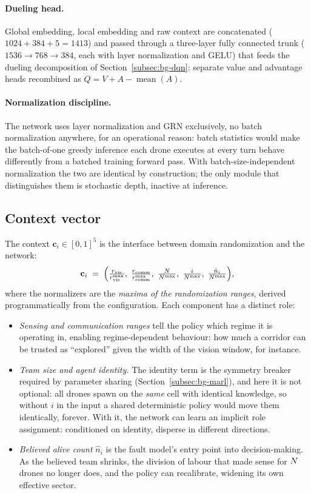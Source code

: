 \paragraph{Dueling head.}
Global embedding, local embedding and raw context are concatenated
($1024 + 384 + 5 = 1413$) and passed through a three-layer fully connected trunk
($1536 \to 768 \to 384$, each with layer normalization and GELU) that feeds the
dueling decomposition of Section~\ref{subsec:bg-dqn}: separate value and
advantage heads recombined as $Q = V + A - \operatorname{mean}(A)$.

\paragraph{Normalization discipline.}
The network uses layer normalization \citep{ba2016layer} and GRN exclusively, no
batch normalization anywhere, for an operational reason: batch statistics would
make the batch-of-one greedy inference each drone executes at every turn behave
differently from a batched training forward pass. With batch-size-independent
normalization the two are identical by construction; the only module that
distinguishes them is stochastic depth, inactive at inference.

\subsection{Context vector}
\label{subsec:arch-context}

The context $\mathbf{c}_i \in [0,1]^5$ is the interface between domain
randomization and the network:
\[
\mathbf{c}_i \;=\;
\Bigl(
\tfrac{r_{\mathrm{vis}}}{r_{\mathrm{vis}}^{\max}},\;
\tfrac{r_{\mathrm{comm}}}{r_{\mathrm{comm}}^{\max}},\;
\tfrac{N}{N^{\max}},\;
\tfrac{i}{N^{\max}},\;
\tfrac{\hat n_i}{N^{\max}}
\Bigr),
\]
where the normalizers are the \emph{maxima of the randomization ranges}, derived
programmatically from the configuration. Each component has a distinct role:

\begin{itemize}[leftmargin=1.5em]
  \item \emph{Sensing and communication ranges} tell the policy which regime it
    is operating in, enabling regime-dependent behaviour: how much a corridor
    can be trusted as ``explored'' given the width of the vision window, for
    instance.
  \item \emph{Team size and agent identity.} The identity term is the symmetry
    breaker required by parameter sharing (Section~\ref{subsec:bg-marl}), and
    here it is not optional: all drones spawn on the \emph{same} cell with
    identical knowledge, so without $i$ in the input a shared deterministic
    policy would move them identically, forever. With it, the network can learn
    an implicit role assignment: conditioned on identity, disperse in different
    directions.
  \item \emph{Believed alive count} $\hat n_i$ is the fault model's entry point
    into decision-making. As the believed team shrinks, the division of labour
    that made sense for $N$ drones no longer does, and the policy can
    recalibrate, widening its own effective sector.
\end{itemize}

